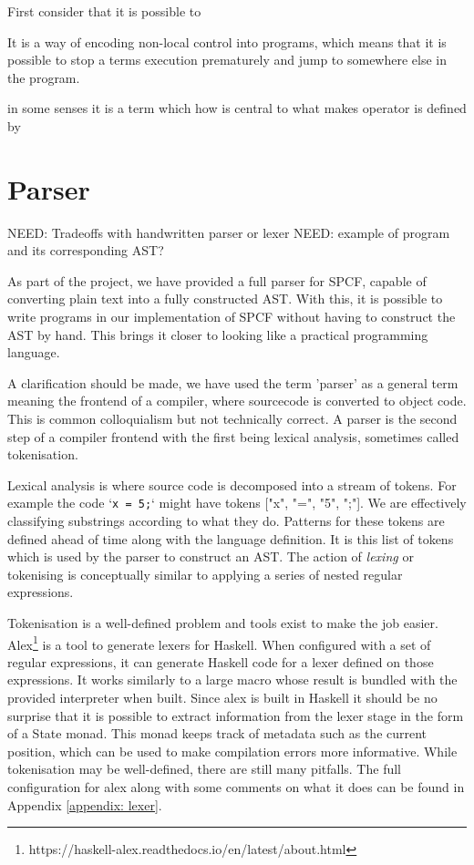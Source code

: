 \documentclass[12pt,a4paper]{report}
\theoremstyle{definition}
\theoremstyle{remark}
\begin{document}
First consider that it is possible to 

It is a way of encoding non-local control into programs, which means that it is possible to stop a terms execution prematurely and jump to somewhere else in the program.

in some senses it  is a term which how  is central to what makes operator is defined by \cite{cartwright_1992}

\section{Parser}
NEED: Tradeoffs with handwritten parser or lexer
NEED: example of program and its corresponding AST?


As part of the project, we have provided a full parser for SPCF, capable of converting plain text into a fully constructed AST. With this, it is possible to write programs in our implementation of SPCF without having to construct the AST by hand. This brings it closer to looking like a practical programming language. 

A clarification should be made, we have used the term 'parser' as a general term meaning the frontend of a compiler, where sourcecode is converted to object code. This is common colloquialism but not technically correct. A parser is the second step of a compiler frontend with the first being lexical analysis, sometimes called tokenisation.

Lexical analysis is where source code is decomposed into a stream of tokens. For example the code `\lstinline{x = 5;}` might have tokens ["x", "=", "5", ";"]. We are effectively classifying substrings according to what they do. Patterns for these tokens are defined ahead of time along with the language definition. It is this list of tokens which is used by the parser to construct an AST. The action of \emph{lexing} or tokenising is conceptually similar to applying a series of nested regular expressions.

Tokenisation is a well-defined problem and tools exist to make the job easier. Alex\footnote{https://haskell-alex.readthedocs.io/en/latest/about.html} is a tool to generate lexers for Haskell. When configured with a set of regular expressions, it can generate Haskell code for a lexer defined on those expressions. It works similarly to a large macro whose result is bundled with the provided interpreter when built. Since alex is built in Haskell it should be no surprise that it is possible to extract information from the lexer stage in the form of a State monad. This monad keeps track of metadata such as the current position, which can be used to make compilation errors more informative. While tokenisation may be well-defined, there are still many pitfalls. The full configuration for alex along with some comments on what it does can be found in Appendix \ref{appendix: lexer}.
\end{document}
